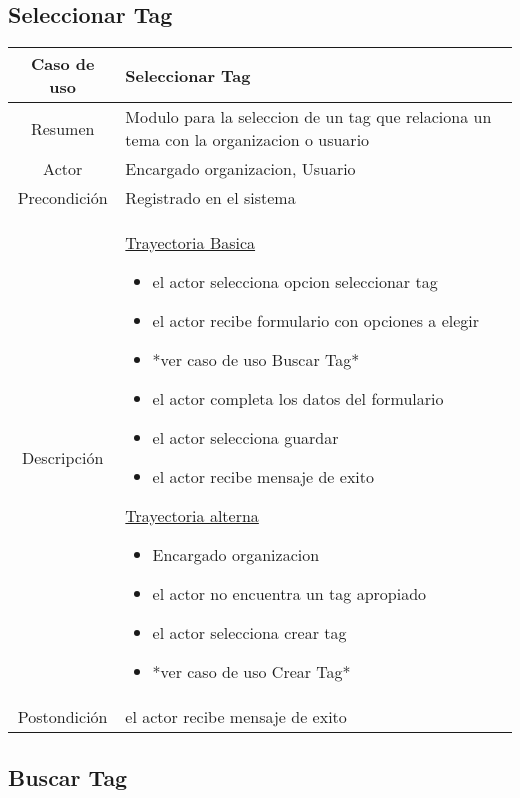 \documentclass[letterpaper,openright,10pt,oneside]{report}
\begin{document}
\subsection{Seleccionar Tag}

\begin{tabular}{|c|p{110mm}|}
\hline
	Caso de uso & Seleccionar Tag\\
\hline
	Resumen & Modulo para la seleccion de un tag que relaciona un tema con la organizacion o usuario\\
\hline
	Actor & Encargado organizacion, Usuario\\
\hline
	Precondición & Registrado en el sistema\\
\hline
	Descripción & 
	\underline{Trayectoria Basica}
	\begin{itemize}
		\item el actor selecciona opcion seleccionar tag
		\item el actor recibe formulario con opciones a elegir
		\item *ver caso de uso Buscar Tag*
		\item el actor completa los datos del formulario
		\item el actor selecciona guardar
		\item el actor recibe mensaje de exito
	\end{itemize}
	\underline{Trayectoria alterna}
	\begin{itemize}
		\item Encargado organizacion
		\item el actor no encuentra un tag apropiado
		\item el actor selecciona crear tag
		\item *ver caso de uso Crear Tag*
	\end{itemize}\\
\hline
	Postondición & el actor recibe mensaje de exito\\
\hline
\end{tabular}

\subsection{Buscar Tag}
\end{document}
